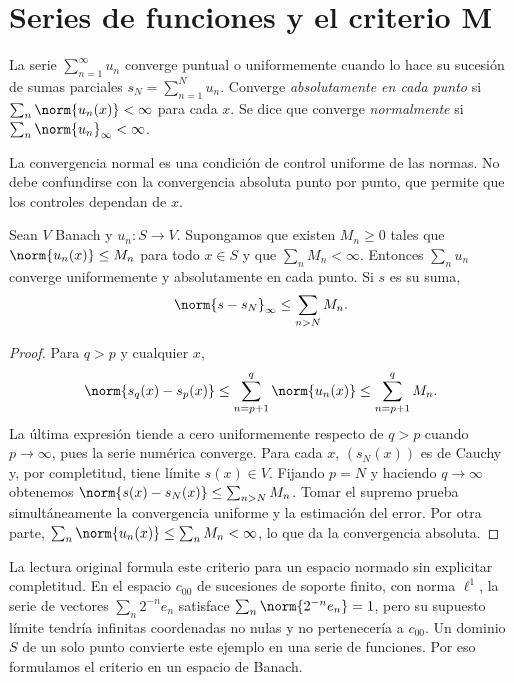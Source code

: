\section{Series de funciones y el criterio M}
\begin{definicion}
La serie $\sum_{n=1}^\infty u_n$ converge puntual o uniformemente cuando lo hace su sucesión de sumas parciales $s_N=\sum_{n=1}^N u_n$. Converge \emph{absolutamente en cada punto} si $\sum_n\norm{u_n(x)}<\infty$ para cada $x$. Se dice que converge \emph{normalmente} si $\sum_n\norm{u_n}_\infty<\infty$.
\end{definicion}

La convergencia normal es una condición de control uniforme de las normas. No debe confundirse con la convergencia absoluta punto por punto, que permite que los controles dependan de $x$.

\begin{teorema}\label{ch26:criteriom}
Sean $V$ Banach y $u_n:S\to V$. Supongamos que existen $M_n\ge0$ tales que $\norm{u_n(x)}\le M_n$ para todo $x\in S$ y que $\sum_n M_n<\infty$. Entonces $\sum_nu_n$ converge uniformemente y absolutamente en cada punto. Si $s$ es su suma,
\[
 \norm{s-s_N}_\infty\le\sum_{n>N}M_n.
\]
\end{teorema}
\begin{proof}
Para $q>p$ y cualquier $x$,
\[
 \norm{s_q(x)-s_p(x)}
 \le\sum_{n=p+1}^q\norm{u_n(x)}\le\sum_{n=p+1}^qM_n.
\]
La última expresión tiende a cero uniformemente respecto de $q>p$ cuando $p\to\infty$, pues la serie numérica converge. Para cada $x$, $(s_N(x))$ es de Cauchy y, por completitud, tiene límite $s(x)\in V$. Fijando $p=N$ y haciendo $q\to\infty$ obtenemos
$\norm{s(x)-s_N(x)}\le\sum_{n>N}M_n$. Tomar el supremo prueba simultáneamente la convergencia uniforme y la estimación del error. Por otra parte, $\sum_n\norm{u_n(x)}\le\sum_nM_n<\infty$, lo que da la convergencia absoluta.
\end{proof}

\begin{observacion}
La lectura original formula este criterio para un espacio normado sin explicitar completitud. En el espacio $c_{00}$ de sucesiones de soporte finito, con norma $\ell^1$, la serie de vectores $\sum_n 2^{-n}e_n$ satisface $\sum_n\norm{2^{-n}e_n}=1$, pero su supuesto límite tendría infinitas coordenadas no nulas y no pertenecería a $c_{00}$. Un dominio $S$ de un solo punto convierte este ejemplo en una serie de funciones. Por eso formulamos el criterio en un espacio de Banach.
\end{observacion}

